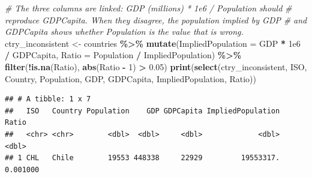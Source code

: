\documentclass[
]{article}
\newenvironment{Shaded}{\begin{snugshade}}{\end{snugshade}}
\newcommand{\AttributeTok}[1]{\textcolor[rgb]{0.13,0.29,0.53}{#1}}
\newcommand{\CommentTok}[1]{\textcolor[rgb]{0.56,0.35,0.01}{\textit{#1}}}
\newcommand{\DecValTok}[1]{\textcolor[rgb]{0.00,0.00,0.81}{#1}}
\newcommand{\FloatTok}[1]{\textcolor[rgb]{0.00,0.00,0.81}{#1}}
\newcommand{\FunctionTok}[1]{\textcolor[rgb]{0.13,0.29,0.53}{\textbf{#1}}}
\newcommand{\NormalTok}[1]{#1}
\newcommand{\OtherTok}[1]{\textcolor[rgb]{0.56,0.35,0.01}{#1}}
\newcommand{\SpecialCharTok}[1]{\textcolor[rgb]{0.81,0.36,0.00}{\textbf{#1}}}
\begin{document}
\begin{Shaded}
\begin{Highlighting}[]
\CommentTok{\# The three columns are linked: GDP (millions) * 1e6 / Population should}
\CommentTok{\# reproduce GDPCapita. When they disagree, the population implied by GDP}
\CommentTok{\# and GDPCapita shows whether Population is the value that is wrong.}
\NormalTok{ctry\_inconsistent }\OtherTok{\textless{}{-}}\NormalTok{ countries }\SpecialCharTok{\%\textgreater{}\%}
  \FunctionTok{mutate}\NormalTok{(}\AttributeTok{ImpliedPopulation =}\NormalTok{ GDP }\SpecialCharTok{*} \FloatTok{1e6} \SpecialCharTok{/}\NormalTok{ GDPCapita,}
         \AttributeTok{Ratio =}\NormalTok{ Population }\SpecialCharTok{/}\NormalTok{ ImpliedPopulation) }\SpecialCharTok{\%\textgreater{}\%}
  \FunctionTok{filter}\NormalTok{(}\SpecialCharTok{!}\FunctionTok{is.na}\NormalTok{(Ratio), }\FunctionTok{abs}\NormalTok{(Ratio }\SpecialCharTok{{-}} \DecValTok{1}\NormalTok{) }\SpecialCharTok{\textgreater{}} \FloatTok{0.05}\NormalTok{)}
\FunctionTok{print}\NormalTok{(}\FunctionTok{select}\NormalTok{(ctry\_inconsistent, ISO, Country, Population, GDP, GDPCapita,}
\NormalTok{             ImpliedPopulation, Ratio))}
\end{Highlighting}
\end{Shaded}

\begin{verbatim}
## # A tibble: 1 x 7
##   ISO   Country Population    GDP GDPCapita ImpliedPopulation    Ratio
##   <chr> <chr>        <dbl>  <dbl>     <dbl>             <dbl>    <dbl>
## 1 CHL   Chile        19553 448338     22929         19553317. 0.001000
\end{verbatim}
\end{document}
